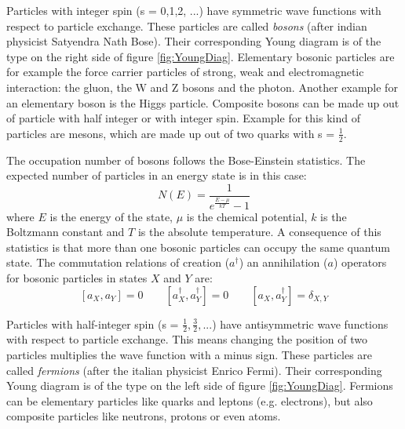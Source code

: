 Particles with integer spin (s = 0,1,2, ...) have symmetric wave functions with respect to particle exchange. These particles are called \textit{bosons} (after indian physicist Satyendra Nath Bose). Their corresponding Young diagram is of the type on the right side of figure \ref{fig:YoungDiag}. Elementary bosonic particles are for example the force carrier particles of strong, weak and electromagnetic interaction: the gluon, the W and Z bosons and the photon. Another example for an elementary boson is the Higgs particle. Composite bosons can be made up out of particle with half integer or with integer spin. Example for this kind of particles are mesons, which are made up out of two quarks with s = $\frac{1}{2}$. 

The occupation number of bosons follows the Bose-Einstein statistics. The expected number of particles in an energy state is in this case:
\begin{equation}
 N(E) = \frac{1}{e^{\frac{E-\mu}{kT}}-1}
\end{equation} 
where $E$ is the energy of the state, $\mu$ is the chemical potential, $k$ is the Boltzmann constant and $T$ is the absolute temperature. A consequence of this statistics is that more than one bosonic particles can occupy the same quantum state. The commutation relations of creation ($a^{\dag}$) an annihilation ($a$) operators for bosonic particles in states $X$ and $Y$ are:
\begin{equation}
\label{eq:bosComm}
 [a_{X},a_{Y}] = 0 \hspace{2em} [a^{\dag}_{X},a^{\dag}_{Y}] = 0 \hspace{2em} [a_{X},a^{\dag}_{Y}] = \delta_{X,Y}
\end{equation} 

Particles with half-integer spin (s = $\frac{1}{2},\frac{3}{2},...$) have antisymmetric wave functions with respect to particle exchange. This means changing the position of two particles multiplies the wave function with a minus sign. These particles are called \textit{fermions} (after the italian physicist Enrico Fermi). Their corresponding Young diagram is of the type on the left side of figure \ref{fig:YoungDiag}. Fermions can be elementary particles like quarks and leptons (e.g. electrons), but also composite particles like neutrons, protons or even atoms. 

